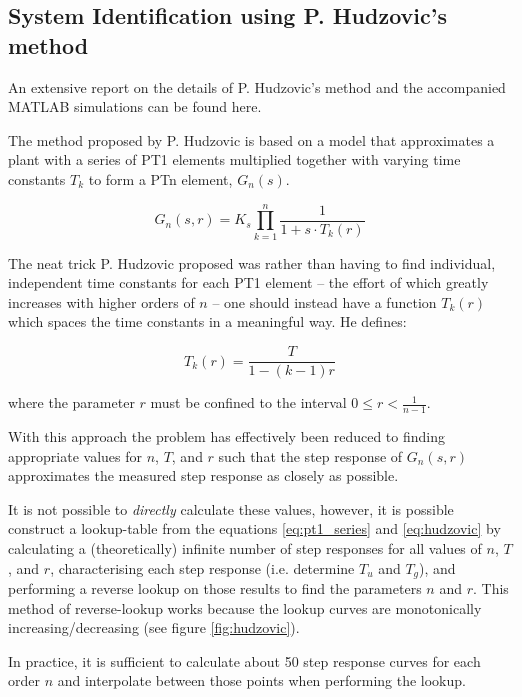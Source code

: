 \subsection{System Identification using P. Hudzovic's method}

An extensive report on the details of P. Hudzovic's method and the accompanied
MATLAB simulations can be found here\cite{ref:comet}.

The method proposed by P. Hudzovic\cite{ref:hudzovic} is based on a model that
approximates a plant with a series of  PT1  elements  multiplied together with
varying time constants $T_k$ to form a PTn element, $G_n(s)$.

\begin{equation}
    G_n(s,r) = K_s\prod_{k=1}^{n}\frac{1}{1+s\cdot T_k(r)}
    \label{eq:pt1_series}
\end{equation}

The neat trick P. Hudzovic proposed was rather than having to find individual,
independent time constants for each PT1 element -- the effort of which greatly
increases with higher orders of $n$  --  one  should  instead  have a function
$T_k(r)$  which  spaces the time constants in a meaningful  way.  He  defines:

\begin{equation}
    T_k(r) = \frac{T}{1-(k-1)r}
    \label{eq:hudzovic}
\end{equation}

where  the  parameter  $r$  must  be confined to  the  interval  $0  \le  r  <
\frac{1}{n-1}$.

With  this  approach  the  problem  has  effectively been reduced  to  finding
appropriate values for $n$,  $T$,  and  $r$  such  that  the  step response of
$G_n(s,r)$  approximates the measured step response as  closely  as  possible.

It is not possible to \textit{directly} calculate these values, however, it is
possible construct a lookup-table from the  equations  \ref{eq:pt1_series} and
\ref{eq:hudzovic} by calculating  a  (theoretically)  infinite  number of step
responses  for  all  values  of  $n$,  $T$,  and $r$, characterising each step
response (i.e. determine $T_u$ and $T_g$),  and performing a reverse lookup on
those  results  to  find  the  parameters  $n$  and  $r$.   This   method   of
reverse-lookup   works   because   the   lookup   curves   are   monotonically
increasing/decreasing (see figure \ref{fig:hudzovic}).


In practice, it is sufficient to calculate about 50 step  response  curves for
each order  $n$  and  interpolate  between  those  points  when performing the
lookup.

